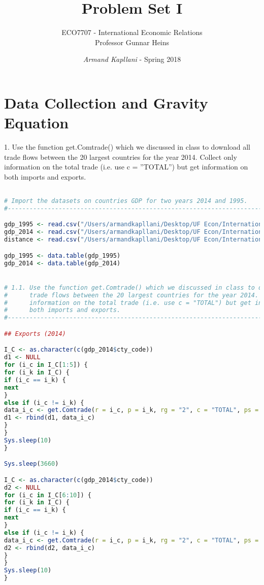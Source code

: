 \documentclass[a4paper]{article}
\title{\large Problem Set I}
\author{ECO7707 - International Economic Relations \\
	\small{Professor Gunnar Heins}}
\date{\small{\textit{Armand Kapllani} - Spring 2018}}
\begin{document}
	\maketitle

\section*{Data Collection and Gravity Equation}

1. Use the function get.Comtrade() which we discussed in class to download all trade flows between the 20 largest countries for the year 2014. Collect only information on the total trade (i.e. use c = ”TOTAL”) but get information on both imports and exports.

\begin{lstlisting}[language=R, small]

# Import the datasets on countries GDP for two years 2014 and 1995. 
#-----------------------------------------------------------------------------------------

gdp_1995 <- read.csv("/Users/armandkapllani/Desktop/UF Econ/International Economic Relations/PS1/gdp_1995.csv", header = T)
gdp_2014 <- read.csv("/Users/armandkapllani/Desktop/UF Econ/International Economic Relations/PS1/gdp_2014.csv", header = T)
distance <- read.csv("/Users/armandkapllani/Desktop/UF Econ/International Economic Relations/PS1/distance.csv", header = T)

gdp_1995 <- data.table(gdp_1995)
gdp_2014 <- data.table(gdp_2014)


# 1.1. Use the function get.Comtrade() which we discussed in class to download all 
#      trade flows between the 20 largest countries for the year 2014. Collect only 
#      information on the total trade (i.e. use c = "TOTAL") but get information on 
#      both imports and exports.
#-----------------------------------------------------------------------------------------

## Exports (2014)

I_C <- as.character(c(gdp_2014$cty_code))
d1 <- NULL
for (i_c in I_C[1:5]) {     
for (i_k in I_C) {
if (i_c == i_k) {
next
}
else if (i_c != i_k) {
data_i_c <- get.Comtrade(r = i_c, p = i_k, rg = "2", c = "TOTAL", ps = "2014")
d1 <- rbind(d1, data_i_c)
}
}
Sys.sleep(10)
}

Sys.sleep(3660)

I_C <- as.character(c(gdp_2014$cty_code))
d2 <- NULL
for (i_c in I_C[6:10]) {
for (i_k in I_C) {
if (i_c == i_k) {
next
}
else if (i_c != i_k) {
data_i_c <- get.Comtrade(r = i_c, p = i_k, rg = "2", c = "TOTAL", ps = "2014")
d2 <- rbind(d2, data_i_c)
}
}
Sys.sleep(10)
}


\end{lstlisting}
\end{document}
